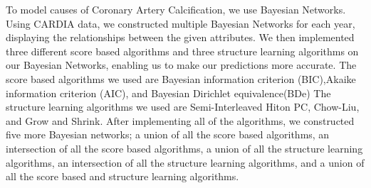 To model causes of Coronary Artery Calcification, we use Bayesian Networks.  Using CARDIA data, we constructed multiple Bayesian Networks for each year, displaying the relationships between the given attributes.  We then implemented three different score based algorithms and three structure learning algorithms on our Bayesian Networks, enabling us to make our predictions more accurate.  The score based algorithms we used are Bayesian information criterion (BIC),Akaike information criterion (AIC), and Bayesian Dirichlet equivalence(BDe)  The structure learning algorithms we used are Semi-Interleaved Hiton PC, Chow-Liu, and Grow and Shrink.  After implementing all of the algorithms, we constructed five more Bayesian networks; a union of all the score based algorithms, an intersection of all the score based algorithms, a union of all the structure learning algorithms, an intersection of all the structure learning algorithms, and a union of all the score based and structure learning algorithms. 
